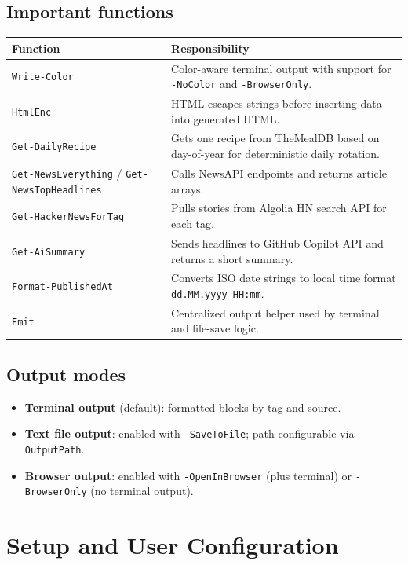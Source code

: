 \documentclass[11pt,a4paper]{article}
\begin{document}
\subsection{Important functions}
\begin{longtable}{>{\raggedright\arraybackslash}p{} >{\raggedright\arraybackslash}p{}}
\textbf{Function} & \textbf{Responsibility} \\
\hline
\texttt{Write-Color} & Color-aware terminal output with support for \texttt{-NoColor} and \texttt{-BrowserOnly}. \\
\texttt{HtmlEnc} & HTML-escapes strings before inserting data into generated HTML. \\
\texttt{Get-DailyRecipe} & Gets one recipe from TheMealDB based on day-of-year for deterministic daily rotation. \\
\texttt{Get-NewsEverything} / \texttt{Get-NewsTopHeadlines} & Calls NewsAPI endpoints and returns article arrays. \\
\texttt{Get-HackerNewsForTag} & Pulls stories from Algolia HN search API for each tag. \\
\texttt{Get-AiSummary} & Sends headlines to GitHub Copilot API and returns a short summary. \\
\texttt{Format-PublishedAt} & Converts ISO date strings to local time format \texttt{dd.MM.yyyy HH:mm}. \\
\texttt{Emit} & Centralized output helper used by terminal and file-save logic. \\
\end{longtable}

\subsection{Output modes}
\begin{itemize}
  \item \textbf{Terminal output} (default): formatted blocks by tag and source.
  \item \textbf{Text file output}: enabled with \texttt{-SaveToFile}; path configurable via \texttt{-OutputPath}.
  \item \textbf{Browser output}: enabled with \texttt{-OpenInBrowser} (plus terminal) or \texttt{-BrowserOnly} (no terminal output).
\end{itemize}

\section{Setup and User Configuration}
\end{document}
